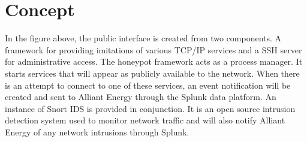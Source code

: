 \section*{\color{NavyBlue}Concept}

\large

\begin{center}
{
\scalebox{1.65}{}
}
\end{center}
\vspace{2cm}

In the figure above, the public interface is created from two components.  A framework for providing imitations of various TCP/IP  services and a SSH server for administrative access. The honeypot framework acts as a process manager. It starts services that will appear as publicly available to the network. When there is an attempt to connect to one of these services, an event notification will be created and sent to Alliant Energy through the Splunk data platform. An instance of Snort IDS is provided in conjunction. It is an open source intrusion detection system used to monitor network traffic and will also notify Alliant Energy of any network intrusions through Splunk.
